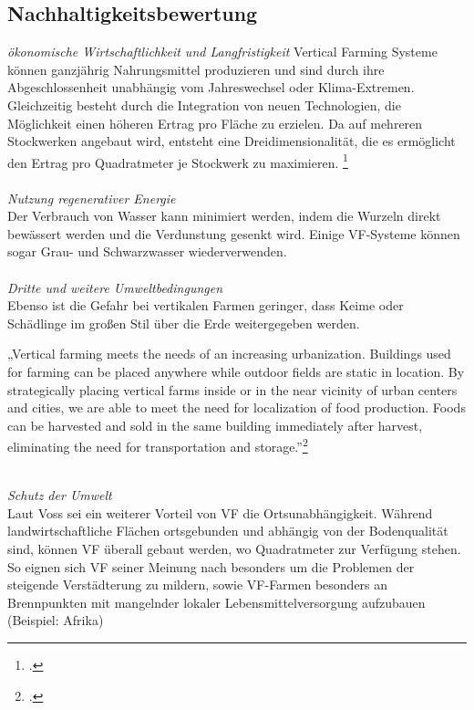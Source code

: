 \documentclass{scrartcl}
\begin{document}
\subsection{Nachhaltigkeitsbewertung}
\textit{ökonomische Wirtschaftlichkeit und Langfristigkeit}
Vertical Farming Systeme können ganzjährig Nahrungsmittel produzieren und sind durch ihre Abgeschlossenheit unabhängig vom Jahreswechsel oder Klima-Extremen. Gleichzeitig besteht durch die Integration von neuen Technologien, die Möglichkeit einen höheren Ertrag pro Fläche zu erzielen. Da auf mehreren Stockwerken angebaut wird, entsteht eine Dreidimensionalität, die es ermöglicht den Ertrag pro Quadratmeter je Stockwerk zu maximieren. \footcite{Despommier2010TheCentury.} \\
\\
\textit{Nutzung regenerativer Energie}\\
Der Verbrauch von Wasser kann minimiert werden, indem die Wurzeln direkt bewässert werden und die Verdunstung gesenkt wird. Einige VF-Systeme können sogar Grau- und Schwarzwasser wiederverwenden. \\
\\
\textit{Dritte und weitere Umweltbedingungen}\\
Ebenso ist die Gefahr bei vertikalen Farmen geringer, dass Keime oder Schädlinge im großen Stil über die Erde weitergegeben werden.\\
\begin{displayquote}
„Vertical farming meets the needs of an increasing urbanization. Buildings used for farming can be placed anywhere while outdoor fields are static in location. By strategically placing vertical farms inside or in the near vicinity of urban centers and cities, we are able to meet the need for localization of food production. Foods can be harvested and sold in the same building immediately after harvest, eliminating the need for transportation and storage.”\footcite[S.7]{PeterMollerVoss2013VerticalRise}
\end{displayquote}
\\
\textit{Schutz der Umwelt}\\
Laut Voss sei ein weiterer Vorteil von VF die Ortsunabhängigkeit. Während landwirtschaftliche Flächen ortsgebunden und abhängig von der Bodenqualität sind, können VF überall gebaut werden, wo Quadratmeter zur Verfügung stehen. So eignen sich VF seiner Meinung nach besonders um die Problemen der steigende Verstädterung zu mildern, sowie VF-Farmen besonders an Brennpunkten mit mangelnder lokaler Lebensmittelversorgung aufzubauen (Beispiel: Afrika)
\end{document}
